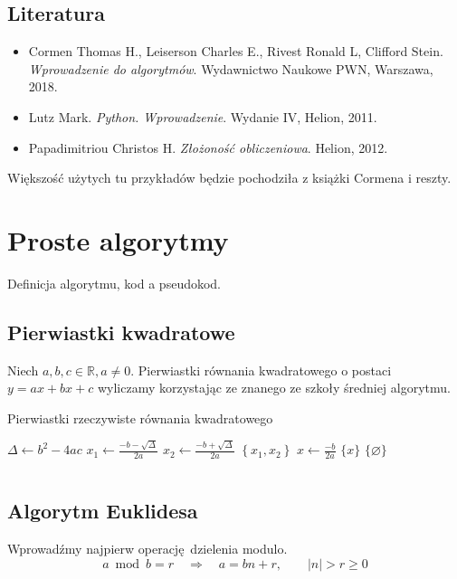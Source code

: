 \documentclass[10pt, oneside]{article}
\theoremstyle{remark}
\begin{document}
\subsection{Literatura}
\begin{itemize}
	\item Cormen Thomas H., Leiserson Charles E., Rivest Ronald L, Clifford Stein. \emph{Wprowadzenie do algorytmów}. Wydawnictwo Naukowe PWN, Warszawa, 2018.
	\item Lutz Mark. \emph{Python. Wprowadzenie}. Wydanie IV, Helion, 2011.
	\item Papadimitriou Christos H. \emph{Złożoność obliczeniowa}. Helion, 2012.
\end{itemize}
Większość użytych tu przykładów będzie pochodziła z książki Cormena i reszty.

\section{Proste algorytmy}

Definicja algorytmu, kod a pseudokod.

\subsection{Pierwiastki kwadratowe}
Niech $a,b,c \in \mathbb{R}, a \neq 0$.
Pierwiastki równania kwadratowego o postaci $y=ax+bx+c$ wyliczamy korzystając ze znanego ze szkoły średniej algorytmu.

\begin{algorithm}
    \caption{Pierwiastki rzeczywiste równania kwadratowego}
    \label{euclid}
    \begin{algorithmic}[1] %
            \State $\Delta \gets b^2 - 4ac$
            	\State $x_1 \gets \frac{-b - \sqrt{\Delta}}{2a}$
            	\State $x_2 \gets \frac{-b + \sqrt{\Delta}}{2a}$
            \State \Return $\left \{x_1, x_2 \right \}$
            		\State $x \gets \frac{-b}{2a} $
            		\State \Return $\{x \}$
            	\Else
            	\State \Return $\{\varnothing\}$
            \EndIf
        \EndFunction
    \end{algorithmic}
\end{algorithm}

\inputminted[linenos]{python}{code/2_quad.py}

\subsection{Algorytm Euklidesa}
Wprowadźmy najpierw operację dzielenia modulo.
\begin{equation*}
	a \bmod b = r \quad \Rightarrow \quad a = bn + r, \qquad |n| > r \ge 0
\end{equation*}
\end{document}
